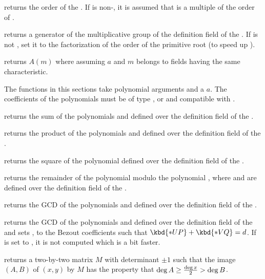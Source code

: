  returns the order of the  .
If  is non-, it is assumed that  is a multiple of the
order of .

 returns a generator of the
multiplicative group of the definition field of the  .
If  is not , set it to the factorization of the order
of the primitive root (to speed up ).

 returns $A(m)$ where  assuming
$a$ and $m$ belongs to fields having the same characteristic.


The functions in this sections take polynomial arguments and a 
$a$. The coefficients of the polynomials must be of type ,
 or  and compatible with .

 returns the sum of the polynomials
 and  defined over the definition field of the 
.

 returns the product of the polynomials
 and  defined over the definition field of the 
.

 returns the square of the polynomial
 defined over the definition field of the  .

 returns the remainder
of the polynomial  modulo the polynomial , where  and
 are defined over the definition field of the  .

 returns the GCD of the polynomials
 and  defined over the definition field of the 
.

returns the GCD of the polynomials  and  defined over
the definition field of the   and sets ,  to
the Bezout coefficients such that $\kbd{*UP} + \kbd{*VQ} = d$.  If  is
set to , it is not computed which is a bit faster.

 returns a two-by-two matrix
$M$ with determinant $\pm 1$ such that the image $(A,B)$ of $(x,y)$ by $M$
has the property that $\deg A \geq {\deg x \over 2} > \deg B$.

